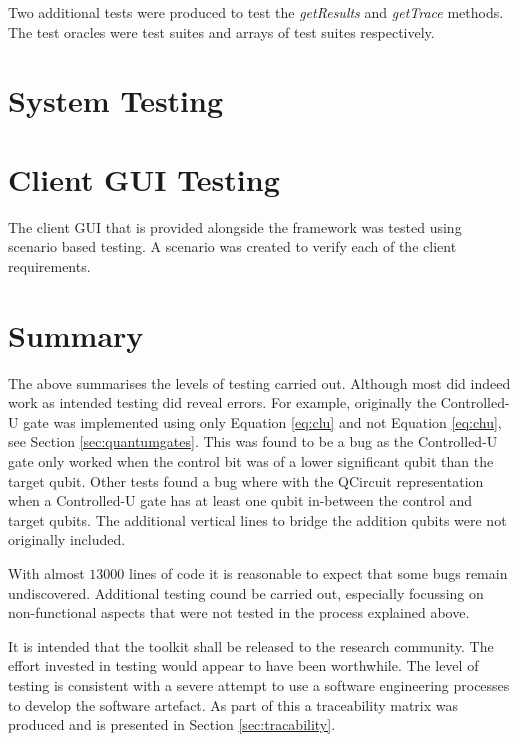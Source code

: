 Two additional tests were produced to test the \emph{getResults} and \emph{getTrace} methods.
The test oracles were test suites and arrays of test suites respectively.

\section{System Testing}
\label{sec:systests}

\section{Client GUI Testing}
\label{sec:clientguitests}
The client GUI that is provided alongside the framework was tested using scenario based testing.
A scenario was created to verify each of the client requirements.

\section{Summary}

The above summarises the levels of testing carried out.
Although most did indeed work as intended testing did reveal errors.
For example, originally the Controlled-U gate was implemented using only Equation \ref{eq:clu} and not Equation \ref{eq:chu}, see Section \ref{sec:quantumgates}.
This was found to be a bug as the Controlled-U gate only worked when the control bit was of a lower significant qubit than the target qubit.
Other tests found a bug where with the QCircuit representation when a Controlled-U gate has at least one qubit in-between the control and target qubits.
The additional vertical lines to bridge the addition qubits were not originally included.

With almost $13000$ lines of code it is reasonable to expect that some bugs remain undiscovered.
Additional testing cound be carried out, especially focussing on non-functional aspects that were not tested in the process explained above.

It is intended that the toolkit shall be released to the research community.
The effort invested in testing would appear to have been worthwhile.
The level of testing is consistent with a severe attempt to use a software engineering processes to develop the software artefact.
As part of this a traceability matrix was produced and is presented in Section \ref{sec:tracability}.

